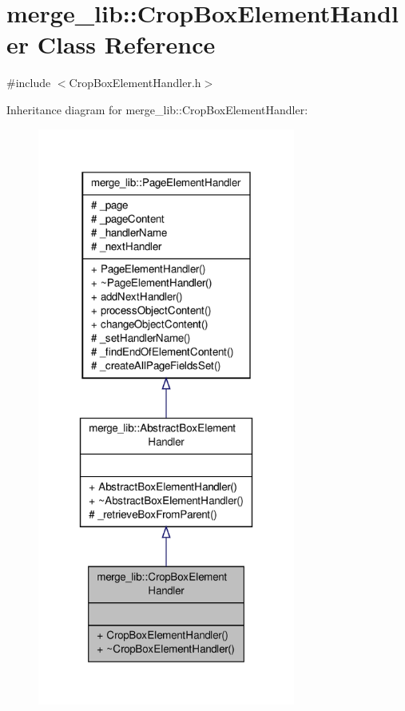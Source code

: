 \hypertarget{classmerge__lib_1_1_crop_box_element_handler}{\section{merge\-\_\-lib\-:\-:Crop\-Box\-Element\-Handler Class Reference}
\label{d3/d79/classmerge__lib_1_1_crop_box_element_handler}
}


{\ttfamily \#include $<$Crop\-Box\-Element\-Handler.\-h$>$}



Inheritance diagram for merge\-\_\-lib\-:\-:Crop\-Box\-Element\-Handler\-:
\nopagebreak
\begin{figure}[H]
\begin{center}
\leavevmode
\includegraphics[width=240pt]{d3/deb/classmerge__lib_1_1_crop_box_element_handler__inherit__graph}
\end{center}
\end{figure}


